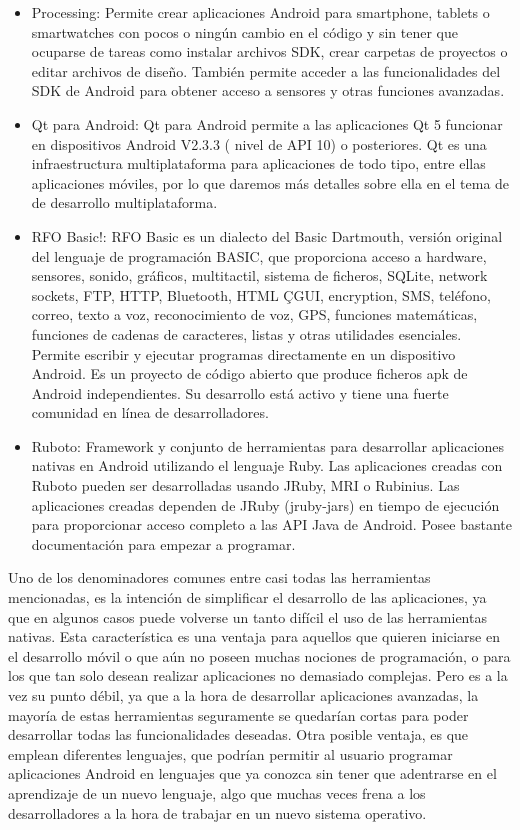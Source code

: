 \documentclass[
10pt, %
a4paper, %
oneside, %
headinclude,footinclude, %
BCOR5mm, %
]{scrartcl}
\begin{document}
\begin{itemize}
	\item Processing: Permite crear aplicaciones Android para smartphone, tablets o smartwatches con pocos o ningún cambio en el código y sin tener que ocuparse de tareas como instalar archivos SDK, crear carpetas de proyectos o editar archivos de diseño. También permite acceder a las funcionalidades del SDK de Android para obtener acceso a sensores y otras funciones avanzadas.

	\item Qt para Android: Qt para Android permite a las aplicaciones Qt 5 funcionar en dispositivos Android V2.3.3 ( nivel de API 10) o posteriores. Qt es una infraestructura multiplataforma para aplicaciones de todo tipo, entre ellas aplicaciones móviles, por lo que daremos más detalles sobre ella en el tema de de desarrollo multiplataforma.

	\item RFO Basic!: RFO Basic es un dialecto del Basic Dartmouth, versión original del lenguaje de programación BASIC, que proporciona acceso a hardware, sensores, sonido, gráficos, multitactil, sistema de ficheros, SQLite, network sockets, FTP, HTTP, Bluetooth, HTML ÇGUI, encryption, SMS, teléfono, correo, texto a voz, reconocimiento de voz, GPS, funciones matemáticas, funciones de cadenas de caracteres, listas y otras utilidades esenciales. Permite escribir y ejecutar programas directamente en un dispositivo Android. Es un proyecto de código abierto que produce ficheros apk de Android independientes. Su desarrollo está activo y tiene una fuerte comunidad en línea de desarrolladores.

	\item Ruboto: Framework y conjunto de herramientas para desarrollar aplicaciones nativas en Android utilizando el lenguaje Ruby. Las aplicaciones creadas con Ruboto pueden ser desarrolladas usando JRuby, MRI o Rubinius. Las aplicaciones creadas dependen de JRuby (jruby-jars) en tiempo de ejecución para proporcionar acceso completo a las API Java de Android. Posee bastante documentación para empezar a programar.
\end{itemize}

Uno de los denominadores comunes entre casi todas las herramientas mencionadas, es la intención de simplificar el desarrollo de las aplicaciones, ya que en algunos casos puede volverse un tanto difícil el uso de las herramientas nativas. Esta característica es una ventaja para aquellos que quieren iniciarse en el desarrollo móvil o que aún no poseen muchas nociones de programación, o para los que tan solo desean realizar aplicaciones no demasiado complejas. Pero es a la vez su punto débil, ya que a la hora de desarrollar aplicaciones avanzadas, la mayoría de estas herramientas seguramente se quedarían cortas para poder desarrollar todas las funcionalidades deseadas. Otra posible ventaja, es que emplean diferentes lenguajes, que podrían permitir al usuario programar aplicaciones Android en lenguajes que ya conozca sin tener que adentrarse en el aprendizaje de un nuevo lenguaje, algo que muchas veces frena a los desarrolladores a la hora de trabajar en un nuevo sistema operativo.
\end{document}
